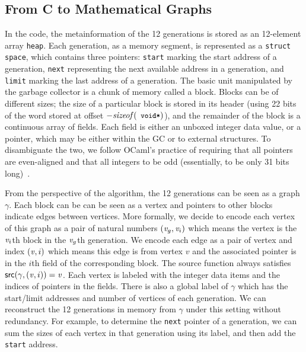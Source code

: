 \documentclass[acmsmall,review,anonymous]{acmart}\settopmatter{printfolios=true,printccs=false,printacmref=false}
\newcommand{\code}[1]{\texttt{\small #1}}
\begin{document}
\subsection{From C to Mathematical Graphs}
\label{sec:movetomathgraph}
In the code, the metainformation of the 12 generations is stored as an
12-element array \code{heap}. Each generation, as a memory segment,
is represented as a \code{struct} \code{space}, which contains
three pointers: \code{start} marking the start address of a
generation, \code{next} representing the next available address in a
generation, and \code{limit} marking the last address of a
generation. The basic unit manipulated by the garbage collector is a
chunk of memory called a block. Blocks can be of different sizes;
the size of a particular block is stored in its
header (using 22 bits of the word stored at offset $-\m{sizeof}(\code{void*})$), and the remainder of the block is a continuous array of fields. 
Each field is either an unboxed integer data value, or a pointer, which may be
either within the GC or to external structures.  To disambiguate the two,
we follow OCaml's practice of requiring that all pointers are even-aligned and 
that all integers to be odd (essentially, to be only 31 bits long)~\cite{realworldocaml}.


From the perspective of the algorithm, the 12 generations can be seen
as a graph $\gamma$. Each block can be can be seen as a
vertex and pointers to other blocks indicate edges between 
vertices. More formally, we decide to encode each vertex of this graph
as a pair of natural numbers $(\mathit{v}_g, \mathit{v}_i)$ which means the vertex is
the $\mathit{v}_i$th block in the $\mathit{v}_g$th generation. We encode each edge
as a pair of vertex and index $(\mathit{v}, i)$ which means this edge is from
vertex $v$ and the associated pointer is in the $i$th field of the
corresponding block.  The source function always satisfies
$\mathsf{src}(\gamma, (\mathit{v}, i)) = \mathit{v}$.
Each vertex is labeled with the integer data items and the indices of pointers in the
fields. There is also a global label of $\gamma$ which has the
start/limit addresses and number of vertices of each generation. We
can reconstruct the 12 generations in memory from $\gamma$ under this
setting without redundancy. For example, to determine the \code{next} pointer of
a generation, we can sum the sizes of each vertex in that generation using its label,
and then add the \code{start} address.
\end{document}
